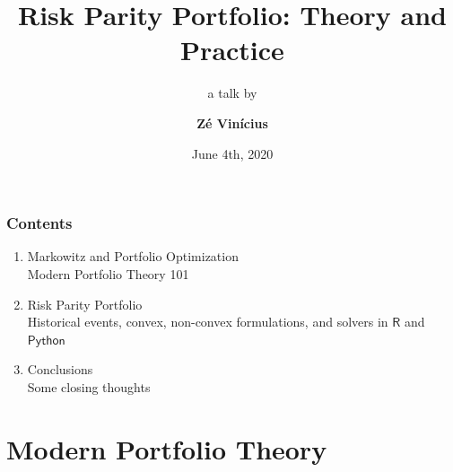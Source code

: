 \documentclass[aspectratio=169]{beamer}
\title{Risk Parity Portfolio: Theory and Practice}
\subtitle{a talk by}
\author{\textbf{Z\'e Vin\'icius}}
\date{June 4th, 2020}
\begin{document}
	\setcounter{showProgressBar}{0}
	\setcounter{showSlideNumbers}{0}

	\frame{\titlepage}

        \begin{frame}
          \frametitle{Contents}
              \vspace{.5cm}
          \begin{enumerate}
            \item Markowitz and Portfolio Optimization
             \\ \textcolor{ExecusharesGrey}{\footnotesize\hspace{1em} Modern Portfolio Theory 101}
            \item Risk Parity Portfolio
             \\ \textcolor{ExecusharesGrey}{\footnotesize\hspace{1em} Historical events, convex, non-convex formulations,
             and solvers in $\mathsf{R}$ and $\mathsf{Python}$}
            \item Conclusions
              \\ \textcolor{ExecusharesGrey}{\footnotesize\hspace{1em} Some closing thoughts}
          \end{enumerate}
        \end{frame}



	\setcounter{showSlideNumbers}{0}
        \section{Modern Portfolio Theory}
	\setcounter{framenumber}{0}
	\setcounter{showProgressBar}{1}
	\setcounter{showSlideNumbers}{1}
\end{document}
